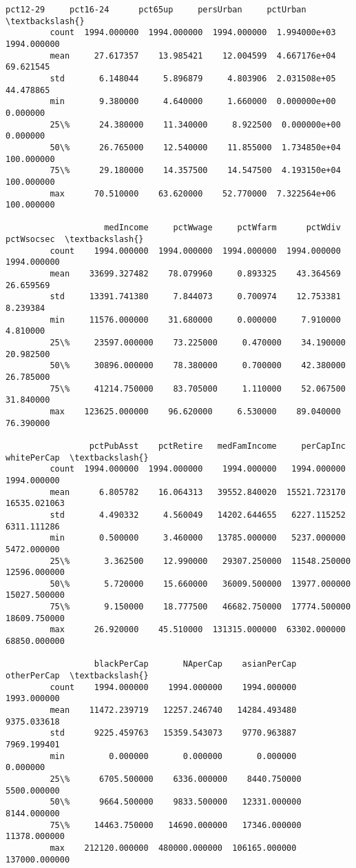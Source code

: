 \documentclass[11pt]{llncs}
\begin{document}
\begin{Verbatim}[commandchars=\\\{\}]
                   pct12-29     pct16-24      pct65up     persUrban     pctUrban  \textbackslash{}
         count  1994.000000  1994.000000  1994.000000  1.994000e+03  1994.000000   
         mean     27.617357    13.985421    12.004599  4.667176e+04    69.621545   
         std       6.148044     5.896879     4.803906  2.031508e+05    44.478865   
         min       9.380000     4.640000     1.660000  0.000000e+00     0.000000   
         25\%      24.380000    11.340000     8.922500  0.000000e+00     0.000000   
         50\%      26.765000    12.540000    11.855000  1.734850e+04   100.000000   
         75\%      29.180000    14.357500    14.547500  4.193150e+04   100.000000   
         max      70.510000    63.620000    52.770000  7.322564e+06   100.000000   
         
                    medIncome     pctWwage     pctWfarm      pctWdiv   pctWsocsec  \textbackslash{}
         count    1994.000000  1994.000000  1994.000000  1994.000000  1994.000000   
         mean    33699.327482    78.079960     0.893325    43.364569    26.659569   
         std     13391.741380     7.844073     0.700974    12.753381     8.239384   
         min     11576.000000    31.680000     0.000000     7.910000     4.810000   
         25\%     23597.000000    73.225000     0.470000    34.190000    20.982500   
         50\%     30896.000000    78.380000     0.700000    42.380000    26.785000   
         75\%     41214.750000    83.705000     1.110000    52.067500    31.840000   
         max    123625.000000    96.620000     6.530000    89.040000    76.390000   
         
                 pctPubAsst    pctRetire   medFamIncome     perCapInc   whitePerCap  \textbackslash{}
         count  1994.000000  1994.000000    1994.000000   1994.000000   1994.000000   
         mean      6.805782    16.064313   39552.840020  15521.723170  16535.021063   
         std       4.490332     4.560049   14202.644655   6227.115252   6311.111286   
         min       0.500000     3.460000   13785.000000   5237.000000   5472.000000   
         25\%       3.362500    12.990000   29307.250000  11548.250000  12596.000000   
         50\%       5.720000    15.660000   36009.500000  13977.000000  15027.500000   
         75\%       9.150000    18.777500   46682.750000  17774.500000  18609.750000   
         max      26.920000    45.510000  131315.000000  63302.000000  68850.000000   
         
                  blackPerCap       NAperCap    asianPerCap    otherPerCap  \textbackslash{}
         count    1994.000000    1994.000000    1994.000000    1993.000000   
         mean    11472.239719   12257.246740   14284.493480    9375.033618   
         std      9225.459763   15359.543073    9770.963887    7969.199401   
         min         0.000000       0.000000       0.000000       0.000000   
         25\%      6705.500000    6336.000000    8440.750000    5500.000000   
         50\%      9664.500000    9833.500000   12331.000000    8144.000000   
         75\%     14463.750000   14690.000000   17346.000000   11378.000000   
         max    212120.000000  480000.000000  106165.000000  137000.000000   
         

\end{Verbatim}
\end{document}
